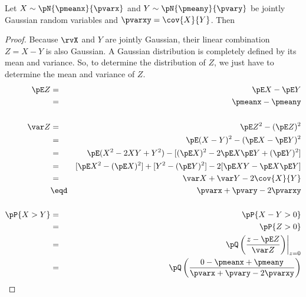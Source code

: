 \begin{proposition}
Let $X\sim\pN{\pmeanx}{\pvarx}$ and $Y\sim\pN{\pmeany}{\pvary}$ be
jointly Gaussian random variables and $\pvarxy=\cov{X}{Y}$.
Then
\end{proposition}
\begin{proof}
Because $\rvX$ and $Y$ are jointly Gaussian,
their linear combination $Z=X-Y$ is also Gaussian.
A Gaussian distribution is completely defined by its mean and variance.
So, to determine the distribution of $Z$,
we just have to determine the mean and variance of $Z$.
\begin{eqnarray*}
  \pE Z
    &=& \pE X - \pE Y
  \\&=& \pmeanx - \pmeany
\\
\\
  \var Z
    &=& \pE Z^2 - (\pE Z)^2
  \\&=& \pE (X-Y)^2 - (\pE X - \pE Y)^2
  \\&=& \pE (X^2-2XY+Y^2) - [(\pE X)^2 -2\pE X \pE Y + (\pE Y)^2 ]
  \\&=& [\pE X^2- (\pE X)^2]  + [Y^2- (\pE Y)^2] - 2[\pE XY - \pE X \pE Y]
  \\&=& \var X + \var Y - 2\cov{X}{Y}
  \\&\eqd& \pvarx + \pvary -2\pvarxy
\\
\\
  \pP{X>Y}
    &=& \pP{X-Y>0}
  \\&=& \pP{Z>0}
  \\&=& \left.\pQ\left(\frac{z-\pE Z}{\var Z} \right)\right|_{z=0}
  \\&=& \pQ\left(\frac{0-\pmeanx+\pmeany}{\pvarx+\pvary-2\pvarxy} \right)
\end{eqnarray*}
\end{proof}
